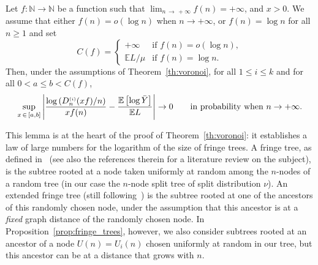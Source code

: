 \documentclass[AHL,Unicode,longabstracts,published]{cedram}
\newcommand{\sss}{\ensuremath{\scriptscriptstyle}}
\newcommand{\bbE}{\mathbb{E}}
\newcommand{\bbN}{\mathbb{N}}
\begin{document}
\begin{prop}\label{prop:fringe_trees}
Let $f\colon \bbN\to \bbN$ be a function such that $\lim_{n\,\to\,+\infty}f(n)=+\infty$, and $x> 0$. We assume that either $f(n) = o(\log n)$ when $n\to+\infty$, or $f(n) = \log n$ for all $n\geq 1$ and set
\[
C(f)=
\begin{cases}+\infty &\text{if }f(n)=o(\log n),\\\bbE L/\mu&\text{if }f(n)=\log n.
\end{cases}
\]
Then, under the assumptions of Theorem~\ref{th:voronoi}, for all $1\leq i\leq k$ and for all $0<a\leq b<C(f)$,
\begin{equation}\label{eq:fringe_trees}
\sup_{x\,\in\,[a,b]} \left|\frac{\log \left(D_n^{\sss (i)}(xf)/n\right)}{xf(n)}- \frac{\bbE\left[\log \bar Y\right]}{\bbE L}\right|\to 0
\qquad\text{in probability when }n\to+\infty.
\end{equation}
\end{prop}

This lemma is at the heart of the proof of Theorem~\ref{th:voronoi}: it establishes a law of large numbers for the logarithm of the size of fringe trees. A fringe tree, as defined in~\cite{JansonHolm} (see also the references therein for a literature review on the subject), is the subtree rooted at a node taken uniformly at random among the $n$-nodes of a random tree (in our case the $n$-node split tree of split distribution $\nu$). An extended fringe tree (still following~\cite{JansonHolm}) is the subtree rooted at one of the ancestors of this randomly chosen node, under the assumption that this ancestor is at a \emph{fixed} graph distance of the randomly chosen node. In Proposition~\ref{prop:fringe_trees}, however, we also consider subtrees rooted at an ancestor of a node $U(n) = U_i(n)$ chosen uniformly at random in our tree, but this ancestor can be at a distance that grows with $n$.
\end{document}
